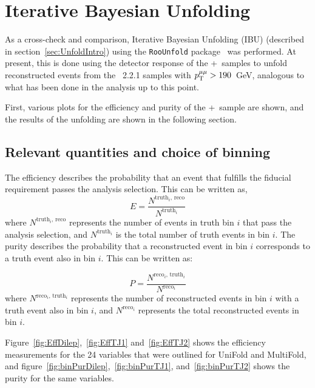 \section{Iterative Bayesian Unfolding}
\label{app:IBU}

As a cross-check and comparison, Iterative Bayesian Unfolding (IBU) (described in section~\ref{sec:UnfoldIntro}) using the \texttt{RooUnfold} package~\cite{Adye:2011gm} was performed. At present, this is done using the detector response of the \powheg+\pythia~samples to unfold reconstructed events from the \sherpa~2.2.1 samples with $p_\mathrm{T}^{\mu\mu} > 190$~GeV, analogous to what has been done in the analysis up to this point.

First, various plots for the efficiency and purity of the \powheg+\pythia~sample are shown, and the results of the unfolding are shown in the following section.

\subsection{Relevant quantities and choice of binning}
The efficiency describes the probability that an event that fulfills the fiducial requirement passes the analysis selection. This can be written as,
\begin{equation}
  E=\frac{N^{\text{truth$_i$, reco}}}{N^{\text{truth$_i$}}}
\end{equation}
where $N^{\text{truth$_i$, reco}}$ represents the number of events in truth bin $i$ that pass the analysis selection, and $N^{\text{truth$_i$}}$ is the total number of truth events in bin $i$. The purity describes the probability that a reconstructed event in bin $i$ corresponds to a truth event also in bin $i$. This can be written as:

\begin{equation}
  P=\frac{N^{\text{reco$_i$, truth$_i$}}}{N^{\text{reco$_i$}}}
\end{equation}
where $N^{\text{reco$_i$, truth$_i$}}$ represents the number of reconstructed events in bin $i$ with a truth event also in bin $i$, and $N^{\text{reco$_i$}}$ represents the total reconstructed events in bin $i$.

Figure~\ref{fig:EffDilep},~\ref{fig:EffTJ1} and~\ref{fig:EffTJ2} shows the efficiency measurements for the 24 variables that were outlined for UniFold and MultiFold, and figure~\ref{fig:binPurDilep},~\ref{fig:binPurTJ1}, and~\ref{fig:binPurTJ2} shows the purity for the same variables.

